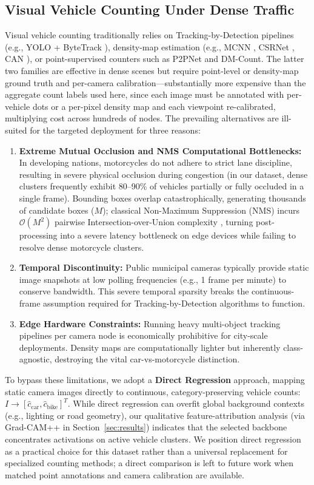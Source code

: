 \documentclass[preprint,12pt]{elsarticle}
\begin{document}
\subsection{Visual Vehicle Counting Under Dense Traffic}
\label{sec:related_counting}
Visual vehicle counting traditionally relies on Tracking-by-Detection pipelines (e.g., YOLO + ByteTrack \citep{yolo}), density-map estimation (e.g., MCNN \citep{mcnn}, CSRNet \citep{csrnet}, CAN \citep{can}), or point-supervised counters such as P2PNet and DM-Count. The latter two families are effective in dense scenes but require point-level or density-map ground truth and per-camera calibration---substantially more expensive than the aggregate count labels used here, since each image must be annotated with per-vehicle dots or a per-pixel density map and each viewpoint re-calibrated, multiplying cost across hundreds of nodes. The prevailing alternatives are ill-suited for the targeted deployment for three reasons:
\begin{enumerate}
    \item \textbf{Extreme Mutual Occlusion and NMS Computational Bottlenecks:} In developing nations, motorcycles do not adhere to strict lane discipline, resulting in severe physical occlusion during congestion (in our dataset, dense clusters frequently exhibit 80--90\% of vehicles partially or fully occluded in a single frame). Bounding boxes overlap catastrophically, generating thousands of candidate boxes ($M$); classical Non-Maximum Suppression (NMS) incurs $\mathcal{O}(M^2)$ pairwise Intersection-over-Union complexity \citep{softnms}, turning post-processing into a severe latency bottleneck on edge devices while failing to resolve dense motorcycle clusters.
    \item \textbf{Temporal Discontinuity:} Public municipal cameras typically provide static image snapshots at low polling frequencies (e.g., 1 frame per minute) to conserve bandwidth. This severe temporal sparsity breaks the continuous-frame assumption required for Tracking-by-Detection algorithms to function.
    \item \textbf{Edge Hardware Constraints:} Running heavy multi-object tracking pipelines per camera node is economically prohibitive for city-scale deployments. Density maps are computationally lighter but inherently class-agnostic, destroying the vital car-vs-motorcycle distinction.
\end{enumerate}

To bypass these limitations, we adopt a \textbf{Direct Regression} approach, mapping static camera images directly to continuous, category-preserving vehicle counts: $I \to [\hat{c}_{\text{car}}, \hat{c}_{\text{bike}}]^T$. While direct regression can overfit global background contexts (e.g., lighting or road geometry), our qualitative feature-attribution analysis (via Grad-CAM++ in Section~\ref{sec:results}) indicates that the selected backbone concentrates activations on active vehicle clusters. We position direct regression as a practical choice for this dataset rather than a universal replacement for specialized counting methods; a direct comparison is left to future work when matched point annotations and camera calibration are available.
\end{document}
